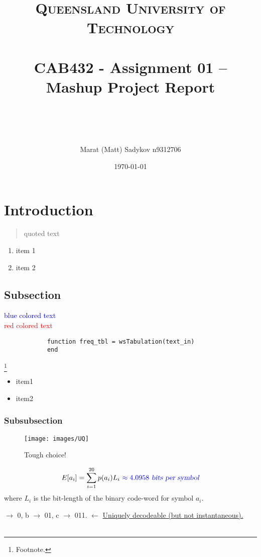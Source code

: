 \documentclass[12pt]{article}
\title{	
	\normalfont \normalsize 
	\textsc{Queensland University of Technology} \\ [25pt] 
	\horrule{0.5pt} \\[0.4cm] %
	\huge CAB432 - Assignment 01 – Mashup Project Report \\ %
	\author{ Marat (Matt) Sadykov \small n9312706 }
	\date{\normalsize\today} %
	\horrule{2pt} \\[0.5cm] %
}
\numberwithin{equation}{section} %
\numberwithin{figure}{section} %
\numberwithin{table}{section} %
\begin{document}
\maketitle
\newpage
\section{Introduction}	
	\begin{quote}
		quoted text
	\end{quote}\label{ref:100}

	\begin{enumerate}
		\item item 1
		\item item 2
	\end{enumerate} 

	\subsection{Subsection}
		\textcolor{blue}{blue colored text}\\
		\textcolor{red}{red colored text}
	
		\begin{lstlisting}
			function freq_tbl = wsTabulation(text_in)	
			end
		\end{lstlisting}
		\footnote{Footnote.}
		
		\begin{itemize}
			\item[] item1
			\item[] item2
		\end{itemize}
	
		\subsubsection{Subsubsection}
			\begin{figure}[H]
				\centering
				\caption{Tough choice!}
				\texttt{[image: images/UQ]}
			\end{figure}		
			$$E[a_i] = \sum\limits_{i=1}^{20} p(a_i)L_i \  \textcolor{blue}{\approx 4.0958 \textsl{ bits per symbol}}$$ where $L_i$ is the bit-length of the binary code-word for symbol $a_i$.

			$\rightarrow$ 0, b $\rightarrow$ 01, c $\rightarrow$ 011.\hspace{1cm} $\leftarrow$ \underline{Uniquely decodeable (but not instantaneous).} \\ \\
\end{document}
